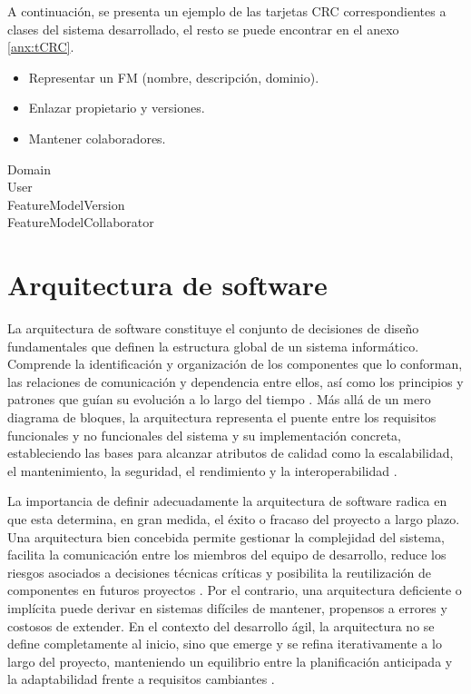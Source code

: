 A continuación, se presenta un ejemplo de las tarjetas \ac{CRC} correspondientes a clases del sistema 
desarrollado, el resto se puede encontrar en el anexo \ref{anx:tCRC}.

\begin{crccard}
	\crcresp
	{
		\begin{itemize}
		\item Representar un \ac{FM} (nombre, descripción, dominio).
		\item Enlazar propietario y versiones.
		\item Mantener colaboradores.
		\end{itemize}
	}
	\crccolab
	{
		Domain\\
		User\\
		FeatureModelVersion\\
		FeatureModelCollaborator
	}
\end{crccard}

\section{Arquitectura de software}

La arquitectura de software constituye el conjunto de decisiones de diseño fundamentales que definen la estructura 
global de un sistema informático. Comprende la identificación y organización de los componentes que lo conforman, 
las relaciones de comunicación y dependencia entre ellos, así como los principios y patrones que guían su evolución a 
lo largo del tiempo \citep{bass2012software}. Más allá de un mero diagrama de bloques, la arquitectura representa el 
puente entre los requisitos funcionales y no funcionales del sistema y su implementación concreta, estableciendo las 
bases para alcanzar atributos de calidad como la escalabilidad, el mantenimiento, la seguridad, el rendimiento y la 
interoperabilidad \citep{clements2010documenting}.

La importancia de definir adecuadamente la arquitectura de software radica en que esta determina, en gran medida, 
el éxito o fracaso del proyecto a largo plazo. Una arquitectura bien concebida permite gestionar la complejidad del 
sistema, facilita la comunicación entre los miembros del equipo de desarrollo, reduce los riesgos asociados a 
decisiones técnicas críticas y posibilita la reutilización de componentes en futuros proyectos 
\citep{rojas2021arquitectura}. Por el contrario, una arquitectura deficiente o implícita puede derivar en sistemas 
difíciles de mantener, propensos a errores y costosos de extender. En el contexto del desarrollo ágil, la arquitectura 
no se define completamente al inicio, sino que emerge y se refina iterativamente a lo largo del proyecto, manteniendo 
un equilibrio entre la planificación anticipada y la adaptabilidad frente a requisitos cambiantes 
\citep{fowler2003design}.

